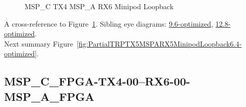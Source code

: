 \begin{figure}[h]
\begin{subfigure}{0.33\textwidth}
\hyperref[sec:MSPCFPGATX406RX606MSPAFPGA6.4-optimized]{}
\end{subfigure}\hspace*{\fill}
\begin{subfigure}{0.33\textwidth}
\hyperref[sec:MSPCFPGATX407RX607MSPAFPGA6.4-optimized]{}
\end{subfigure}\hspace*{\fill}
\begin{subfigure}{0.33\textwidth}
\hyperref[sec:MSPCFPGATX408RX608MSPAFPGA6.4-optimized]{}
\end{subfigure}

\begin{subfigure}{0.33\textwidth}
\hyperref[sec:MSPCFPGATX409RX609MSPAFPGA6.4-optimized]{}
\end{subfigure}\hspace*{\fill}
\begin{subfigure}{0.33\textwidth}
\hyperref[sec:MSPCFPGATX410RX610MSPAFPGA6.4-optimized]{}
\end{subfigure}\hspace*{\fill}
\begin{subfigure}{0.33\textwidth}
\hyperref[sec:MSPCFPGATX411RX611MSPAFPGA6.4-optimized]{}
\end{subfigure}

\caption{MSP\_C TX4 MSP\_A RX6 Minipod Loopback} \label{fig:MSPCTX4MSPARX6MinipodLoopback6.4-optimized}
\end{figure}

A cross-reference to Figure~\ref{fig:MSPCTX4MSPARX6MinipodLoopback6.4-optimized}.
Sibling eye diagrams: \hyperref[sec:MSPCTX4MSPARX6MinipodLoopback9.6-optimized]{9.6-optimized}, \hyperref[sec:MSPCTX4MSPARX6MinipodLoopback12.8-optimized]{12.8-optimized}. \\
Next summary Figure~\ref{fig:PartialTRPTX5MSPARX5MinipodLoopback6.4-optimized}.
\clearpage
% 
\subsection{MSP\_C\_FPGA-TX4-00--RX6-00-MSP\_A\_FPGA}\label{sec:MSPCFPGATX400RX600MSPAFPGA6.4-optimized}

